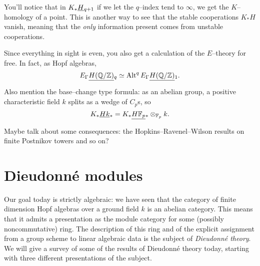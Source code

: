 




\begin{remark}
You'll notice that in $K_* \smash{\underline{H}}_{q+1}$ if we let the $q$--index tend to $\infty$, we get the $K$--homology of a point.  This is another way to see that the stable cooperations $K_* H$ vanish, meaning that the \emph{only} information present comes from unstable cooperations.
\end{remark}

\begin{remark}
Since everything in sight is even, you also get a calculation of the $E$--theory for free.  In fact, as Hopf algebras, \[E_\Gamma \smash{\underline{H(\mathbb{Q}/\mathbb Z)}}_{q} \simeq \operatorname{Alt}^q E_\Gamma \smash{\underline{H(\mathbb{Q}/\mathbb Z)}}_{1}.\]
\end{remark}

\begin{remark}
Also mention the base--change type formula: as an abelian group, a positive characteristic field $k$ splits as a wedge of $C_p$s, so \[K_* \smash{\underline{Hk}}_{*} = K_* \smash{\underline{H\mathbb F_p}}_{*} \otimes_{\mathbb F_p} k.\]
\end{remark}





Maybe talk about some consequences: the Hopkins--Ravenel--Wilson results on finite Postnikov towers and so on?








\section{Dieudonn\'e modules}

Our goal today is strictly algebraic: we have seen that the category of finite dimension Hopf algebras over a ground field $k$ is an abelian category.  This means that it admits a presentation as the module category for some (possibly noncommutative) ring.  The description of this ring and of the explicit assignment from a group scheme to linear algebraic data is the subject of \emph{Dieudonn\'e theory}.  We will give a survey of some of the results of Dieudonn\'e theory today, starting with three different presentations of the subject.

